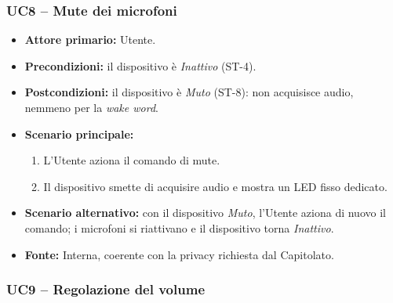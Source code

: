 \documentclass[12pt,a4paper]{article}
\newcommand{\tightlist}{\setlength{\itemsep}{1pt}\setlength{\parskip}{0pt}}
\begin{document}
\subsubsection{UC8 -- Mute dei microfoni}

\begin{itemize}

\tightlist

\item \textbf{Attore primario:} Utente.

\item \textbf{Precondizioni:} il dispositivo è \emph{Inattivo} (ST-4).

\item \textbf{Postcondizioni:} il dispositivo è \emph{Muto} (ST-8): non acquisisce audio, nemmeno per la \emph{wake word}.

\item \textbf{Scenario principale:}

\begin{enumerate}

\tightlist

\item L'Utente aziona il comando di mute.

\item Il dispositivo smette di acquisire audio e mostra un LED fisso dedicato.

\end{enumerate}

\item \textbf{Scenario alternativo:} con il dispositivo \emph{Muto}, l'Utente aziona di nuovo il comando; i microfoni si riattivano e il dispositivo torna \emph{Inattivo}.

\item \textbf{Fonte:} Interna, coerente con la privacy richiesta dal Capitolato.

\end{itemize}



\subsubsection{UC9 -- Regolazione del volume}
\end{document}
